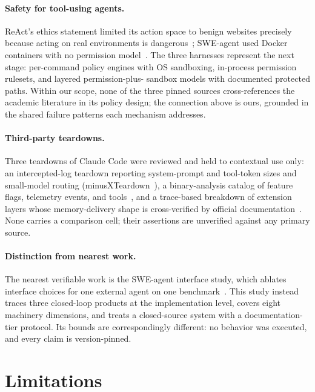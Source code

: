 \documentclass{article}
\newcommand{\ccc}[0]{Claude Code}
\begin{document}
\paragraph{Safety for tool-using agents.} ReAct's ethics statement limited
its action space to benign websites precisely because acting on real
environments is dangerous~\citep{yao2023react}; SWE-agent used Docker
containers with no permission model~\citep{yang2024sweagent}. The three
harnesses represent the next stage: per-command policy engines with OS
sandboxing, in-process permission rulesets, and layered permission-plus-
sandbox models with documented protected paths. Within our scope, none of
the three pinned sources cross-references the academic literature in its
policy design; the connection above is ours, grounded in the shared
failure patterns each mechanism addresses.

\paragraph{Third-party teardowns.} Three teardowns of \ccc{} were reviewed
and held to contextual use only: an intercepted-log teardown reporting
system-prompt and tool-token sizes and small-model routing
(minusXTeardown~\citep{minusXTeardown}), a binary-analysis catalog of
feature flags, telemetry events, and tools~\citep{tenguDecoded}, and a
trace-based breakdown of extension layers whose memory-delivery shape is
cross-verified by official documentation~\citep{agiflowInternals}. None
carries a comparison cell; their assertions are unverified against any
primary source.

\paragraph{Distinction from nearest work.} The nearest verifiable work is
the SWE-agent interface study, which ablates interface choices for one
external agent on one benchmark~\citep{yang2024sweagent}. This study
instead traces three closed-loop products at the implementation level,
covers eight machinery dimensions, and treats a closed-source system with a
documentation-tier protocol. Its bounds are correspondingly different:
no behavior was executed, and every claim is version-pinned.

\section{Limitations}
\label{sec:limitations}
\end{document}
